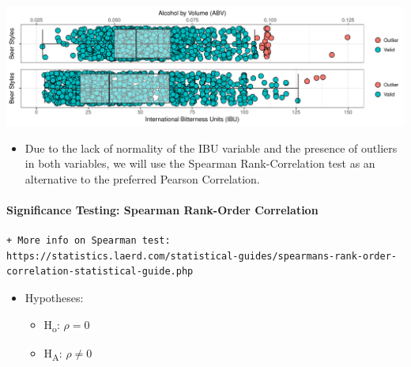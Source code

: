 \documentclass[]{article}
\newenvironment{Shaded}{\begin{snugshade}}{\end{snugshade}}
\newcommand{\KeywordTok}[1]{\textcolor[rgb]{0.13,0.29,0.53}{\textbf{#1}}}
\newcommand{\DataTypeTok}[1]{\textcolor[rgb]{0.13,0.29,0.53}{#1}}
\newcommand{\FloatTok}[1]{\textcolor[rgb]{0.00,0.00,0.81}{#1}}
\newcommand{\StringTok}[1]{\textcolor[rgb]{0.31,0.60,0.02}{#1}}
\newcommand{\CommentTok}[1]{\textcolor[rgb]{0.56,0.35,0.01}{\textit{#1}}}
\newcommand{\OtherTok}[1]{\textcolor[rgb]{0.56,0.35,0.01}{#1}}
\newcommand{\OperatorTok}[1]{\textcolor[rgb]{0.81,0.36,0.00}{\textbf{#1}}}
\newcommand{\NormalTok}[1]{#1}
\providecommand{\tightlist}{%
  \setlength{\itemsep}{0pt}\setlength{\parskip}{0pt}}
\let\oldparagraph\paragraph
\renewcommand{\paragraph}[1]{\oldparagraph{#1}\mbox{}}
\begin{document}
\begin{Shaded}
\begin{Highlighting}[]
{{{{{\KeywordTok{grid.arrange}\NormalTok{(bp_abv, bp_ibu)}
\end{Highlighting}
\end{Shaded}

\begin{center}\includegraphics{Analysis_Final_files/figure-latex/unnamed-chunk-26-1} \end{center}

\begin{itemize}
\tightlist
\item
  Due to the lack of normality of the IBU variable and the presence of
  outliers in both variables, we will use the Spearman Rank-Correlation
  test as an alternative to the preferred Pearson Correlation.
\end{itemize}

\paragraph{Significance Testing: Spearman Rank-Order
Correlation}\label{significance-testing-spearman-rank-order-correlation}

\begin{verbatim}
+ More info on Spearman test: https://statistics.laerd.com/statistical-guides/spearmans-rank-order-correlation-statistical-guide.php
\end{verbatim}

\begin{itemize}
\tightlist
\item
  Hypotheses:

  \begin{itemize}
  \tightlist
  \item
    H\textsubscript{o}: \(\rho= 0\)
  \item
    H\textsubscript{A}: \(\rho\neq 0\)
  \end{itemize}
\end{itemize}

\begin{Shaded}
\end{Shaded}
\end{document}

